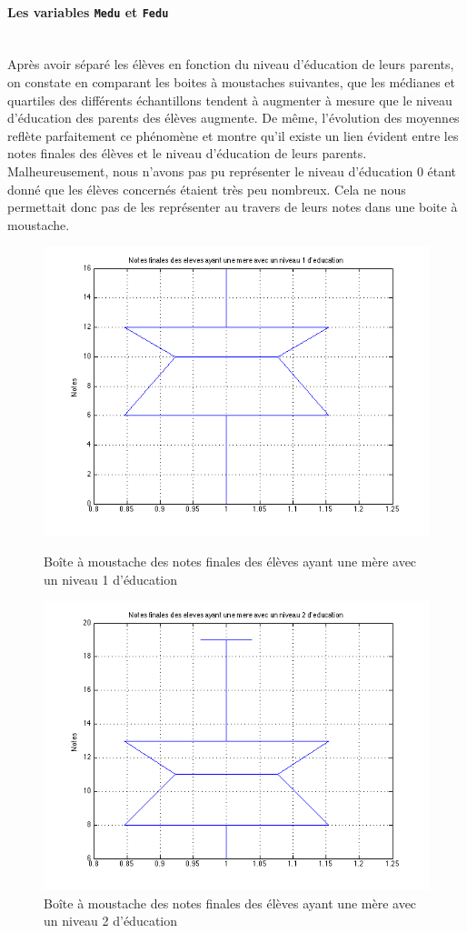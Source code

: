 \documentclass[11pt]{article}
\begin{document}
\paragraph{Les variables \texttt{Medu} et \texttt{Fedu}}~\\\indent
Après avoir séparé les élèves en fonction du niveau d'éducation de leurs parents, on constate en comparant les boites à moustaches suivantes, que les médianes et quartiles des différents échantillons tendent à augmenter à mesure que le niveau d'éducation des parents des élèves augmente. De même, l'évolution des moyennes reflète parfaitement ce phénomène et montre qu'il existe un lien évident entre les notes finales des élèves et le niveau d'éducation de leurs parents. Malheureusement, nous n'avons pas pu représenter le niveau d'éducation 0 étant donné que les élèves concernés étaient très peu nombreux. Cela ne nous permettait donc pas de les représenter au travers de leurs notes dans une boite à moustache.
\begin{figure}[h]
\centering
\includegraphics[scale=0.45]{Images/fig30.png}
\caption{Boîte à moustache des notes finales des élèves ayant une mère avec un niveau 1 d'éducation}
\includegraphics[scale=0.45]{Images/fig31.png}
\caption{Boîte à moustache des notes finales des élèves ayant une mère avec un niveau 2 d'éducation}
\end{figure}
\end{document}
